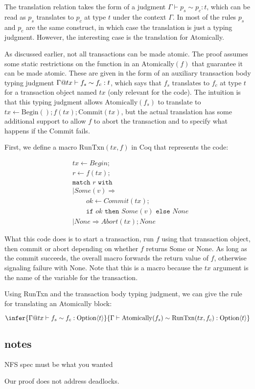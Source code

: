 The translation relation takes the form of a judgment
$\Gamma \vdash p_{s} \sim p_{c} : t$, which can be read as $p_{s}$ translates to
$p_{c}$ at type $t$ under the context $\Gamma$. In most of the rules $p_{s}$  and
$p_{c}$ are the same construct, in which case the translation is just a typing
judgment. However, the interesting case is the translation for Atomically.

As discussed earlier, not all transactions can be made atomic. The proof assumes
some static restrictions on the function in an $\mathrm{Atomically}(f)$ that
guarantee it can be made atomic. These are given in the form of an auxiliary
transaction body typing judgment $\Gamma @ tx \vdash f_{s} \sim f_{c} : t$,
which says that $f_{s}$ translates to $f_{c}$ at type $t$ for a transaction
object named $tx$ (only relevant for the code). The intuition is that this
typing judgment allows $\mathrm{Atomically}(f_{s})$ to translate to
$tx \gets \mathrm{Begin}(); f(tx); \mathrm{Commit}(tx)$, but the actual
translation has some additional support to allow $f$ to abort the transaction
and to specify what happens if the Commit fails.

First, we define a macro $\mathrm{RunTxn}(tx, f)$ in Coq that represents the
code:

\begin{align*}
  &tx \gets Begin; \\
  &r \gets f(tx); \\
  &\texttt{match } r \texttt{ with} \\
  &| Some(v) \Rightarrow \\
  & \qquad ok \gets Commit(tx); \\
  & \qquad \texttt{if } ok \texttt{ then } Some(v) \texttt{ else } None \\
  & | None \Rightarrow Abort(tx); None
\end{align*}

What this code does is to start a transaction, run $f$ using that transaction
object, then commit or abort depending on whether $f$ returns Some or None. As long as
the commit succeeds, the overall macro forwards the return value of $f$,
otherwise signaling failure with None. Note that this is a macro because the
$tx$ argument is the name of the variable for the transaction.

Using RunTxn and the transaction body typing judgment, we can give the rule for
translating an Atomically block:

\[
  \infer{\Gamma @ tx \proves f_{s} \sim f_{c} : \mathrm{Option}\targ{t}}%
{\Gamma \proves \mathrm{Atomically}(f_{s}) \sim \mathrm{RunTxn}(tx, f_{c}) : \mathrm{Option}\targ{t}}
\]

\subsection{notes}

NFS spec must be what you wanted

Our proof does not address deadlocks.

